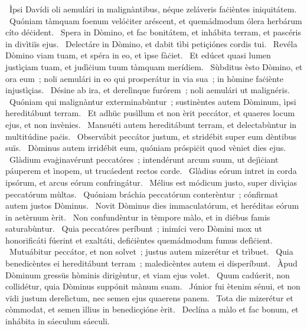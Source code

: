 {~Ìpsi Davídi}
{%
oli aemulári in malignàntibus, néque zeláveris faċièntes iniquitátem.
~Quóniam tàmquam foenum velóċiter aréscent, et quemádmodum ólera herbárum cíto déċident.
~Spera in Dòmino, et fac bonitátem, et inhábita terram, et pascéris in divìtiïs ejus.
~Delectáre in Dòmino, et dabit tìbi petiçiónes cordis tui.
~Revéla Dòmino viam tuam, et spéra in eo, et ìpse fàċiet.
~Et edúcet quasi lumen justìçiam tuam, et judìċium tuum tàmquam merídiem.
~Sùbditus èsto Dòmino, et ora eum~; noli aemulári in eo qui prosperátur in via sua~; in hòmine faċiènte injustìçias.
~Désine ab ira, et derelìnque furórem~; noli aemulári ut malignéris.
~Quóniam qui malignàntur exterminabùntur~; sustinèntes autem Dòminum, ìpsi hereditábunt terram.
~Et adhüc pusìllum et non èrit peccátor, et quaeres locum ejus, et non invènies.
~Mansuéti autem hereditábunt terram, et delectabùntur in multitúdine paċis.
~Observábit peccátor justum, et stridébit super eum dèntibus suïs.
~Dòminus autem irridébit eum, quóniam próspiċit quod vèniet dies ejus.
~Glàdium evaġinavérunt peccatóres~; intendérunt arcum suum, ut dejìċiant páuperem et ìnopem, ut trucáedent rectos corde.
~Glàdius eórum intret in corda ipsórum, et arcus eórum confringátur.
~Mélius est módicum justo, super divìçias peccatórum mùltas.
~Quóniam bráchia peccatórum conterèntur~; cónfirmat autem justos Dòminus.
~Novit Dòminus dies immaculatórum, et heréditas eórum in aetèrnum èrit.
~Non confundèntur in tèmpore màlo, et in diébus famis saturabùntur.
~Quia peccatóres períbunt~; inimíci vero Dòmini mox ut honorificáti fúerint et exaltáti, defiċièntes quemádmodum fumus defìċient.
~Mutuábitur peccátor, et non solvet~; justus autem mizerétur et trìbuet.
~Quia benedicèntes ei hereditábunt terram~; maledicèntes autem ei disperíbunt.
~Àpud Dòminum gressüs hòminis dirigèntur, et viam ejus volet.
~Quum cadúerit, non collidétur, quia Dòminus suppónit mànum suam.
~Júnior fui ètenim sénui, et non vïdi justum derelìctum, nec semen ejus quaerens panem.
~Tota die mizerétur et còmmodat, et semen ìllius in benedicçióne èrit.
~Declína a màlo et fac bonum, et inhábita in sáeculum sáeculi.
}
